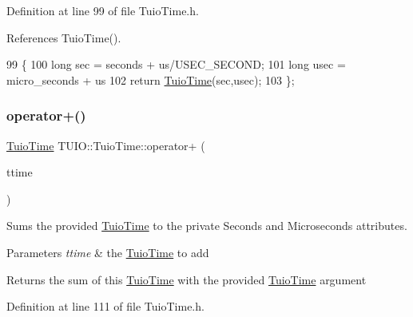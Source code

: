 Definition at line 99 of file Tuio\+Time.\+h.



References Tuio\+Time().


\begin{DoxyCode}
99                                     \{
100             \textcolor{keywordtype}{long} sec = seconds + us/USEC\_SECOND;
101             \textcolor{keywordtype}{long} usec = micro\_seconds + us%
102             \textcolor{keywordflow}{return} \hyperlink{class_t_u_i_o_1_1_tuio_time_a924521ecf43b6484fad9550661eedb0a}{TuioTime}(sec,usec);
103         \};
\end{DoxyCode}
\mbox{\label{class_t_u_i_o_1_1_tuio_time_a78bbf034a3b03400954e3dd3a6ba0ba4}} 
\subsubsection{\texorpdfstring{operator+()}{operator+()}\hspace{0.1cm}{\footnotesize\ttfamily [2/2]}}
{\footnotesize\ttfamily \hyperlink{class_t_u_i_o_1_1_tuio_time}{Tuio\+Time} T\+U\+I\+O\+::\+Tuio\+Time\+::operator+ (\begin{DoxyParamCaption}\item[{\hyperlink{class_t_u_i_o_1_1_tuio_time}{Tuio\+Time}}]{ttime }\end{DoxyParamCaption})\hspace{0.3cm}{\ttfamily [inline]}}

Sums the provided \hyperlink{class_t_u_i_o_1_1_tuio_time}{Tuio\+Time} to the private Seconds and Microseconds attributes.


\begin{DoxyParams}{Parameters}
{\em ttime} & the \hyperlink{class_t_u_i_o_1_1_tuio_time}{Tuio\+Time} to add \\
\hline
\end{DoxyParams}
\begin{DoxyReturn}{Returns}
the sum of this \hyperlink{class_t_u_i_o_1_1_tuio_time}{Tuio\+Time} with the provided \hyperlink{class_t_u_i_o_1_1_tuio_time}{Tuio\+Time} argument 
\end{DoxyReturn}


Definition at line 111 of file Tuio\+Time.\+h.




